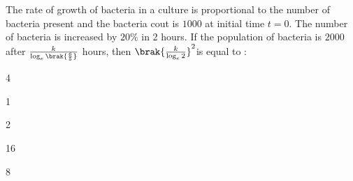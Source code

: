 	\item The rate of growth of bacteria in a culture is proportional to the number of bacteria present and the bacteria cout is $1000$ at initial time $t = 0$. The number of bacteria is increased by $20\%$ in 2 hours. If the population of bacteria is $2000$ after $\frac{k}{\log_e \brak{\frac{6}{5}}}$ hours, then $\brak{\frac{k}{\log_e 2}}^2 $is equal to :
		\hfill{}
		\begin{enumerate}
		\end{enumerate}


